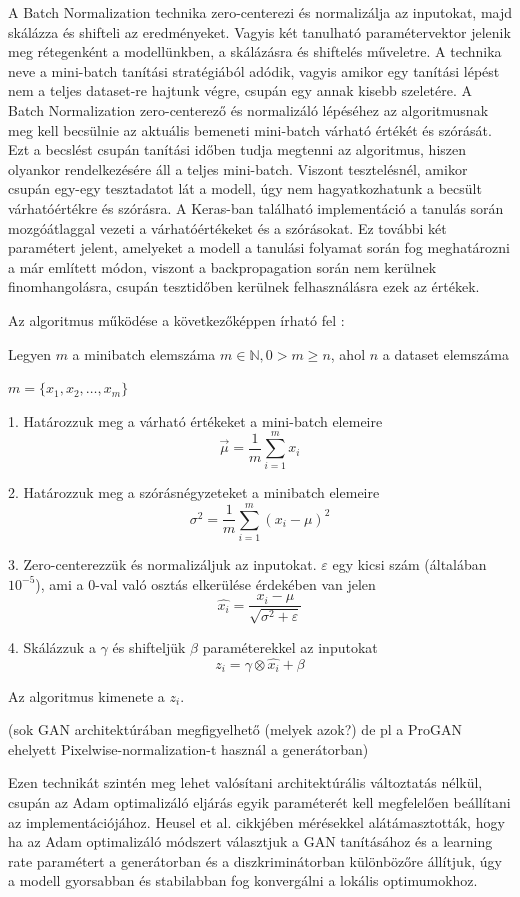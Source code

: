 A Batch Normalization technika zero-centerezi és normalizálja az inputokat, majd skálázza és shifteli az eredményeket. Vagyis két tanulható paramétervektor jelenik meg rétegenként a modellünkben, a skálázásra és shiftelés műveletre. A technika neve a mini-batch tanítási stratégiából adódik, vagyis amikor egy tanítási lépést nem a teljes dataset-re hajtunk végre, csupán egy annak kisebb szeletére. A Batch Normalization zero-centerező és normalizáló lépéséhez az algoritmusnak meg kell becsülnie az aktuális bemeneti mini-batch várható értékét és szórását. Ezt a becslést csupán tanítási időben tudja megtenni az algoritmus, hiszen olyankor rendelkezésére áll a teljes mini-batch. Viszont tesztelésnél, amikor csupán egy-egy tesztadatot lát a modell, úgy nem hagyatkozhatunk a becsült várhatóértékre és szórásra. A Keras-ban található implementáció a tanulás során mozgóátlaggal vezeti a várhatóértékeket és a szórásokat. Ez további két paramétert jelent, amelyeket a modell a tanulási folyamat során fog meghatározni a már említett módon, viszont a backpropagation során nem kerülnek finomhangolásra, csupán tesztidőben kerülnek felhasználásra ezek az értékek.

Az algoritmus működése a következőképpen írható fel \cite{geron2019hands}:

Legyen $m$ a minibatch elemszáma $m \in \mathbb{N}, 0 > m \ge n$, ahol $n$ a dataset elemszáma

$m = \{x_1, x_2, \ldots, x_m \}$ 

1. Határozzuk meg a várható értékeket a mini-batch elemeire
$$ \vec{\mu} = \frac{1}{m} \sum_{i=1}^{m} x_i $$

2. Határozzuk meg a szórásnégyzeteket a minibatch elemeire
$$ \sigma^2 = \frac{1}{m} \sum_{i=1}^{m} (x_i - \mu)^2 $$

3. Zero-centerezzük és normalizáljuk az inputokat. $\varepsilon$ egy kicsi szám (általában $10^{-5}$), ami a 0-val való osztás elkerülése érdekében van jelen
$$ \hat{x_i} = \frac{x_i - \mu}{\sqrt{\sigma^2 + \varepsilon}} $$

4. Skálázzuk a $\gamma$ és shifteljük $\beta$ paraméterekkel az inputokat
$$ z_i = \gamma \otimes \hat{x_i} + \beta$$

Az algoritmus kimenete a $z_i$.

(sok GAN architektúrában megfigyelhető (melyek azok?) de pl a ProGAN ehelyett Pixelwise-normalization-t használ a generátorban)


Ezen technikát szintén meg lehet valósítani architektúrális változtatás nélkül, csupán az Adam optimalizáló eljárás egyik paraméterét kell megfelelően beállítani az implementációjához.
Heusel et al. \cite{heusel2017gans} cikkjében mérésekkel alátámasztották, hogy ha az Adam optimalizáló módszert választjuk a GAN tanításához és a learning rate paramétert a generátorban és a diszkriminátorban különbözőre állítjuk, úgy a modell gyorsabban és stabilabban fog konvergálni a lokális optimumokhoz.

